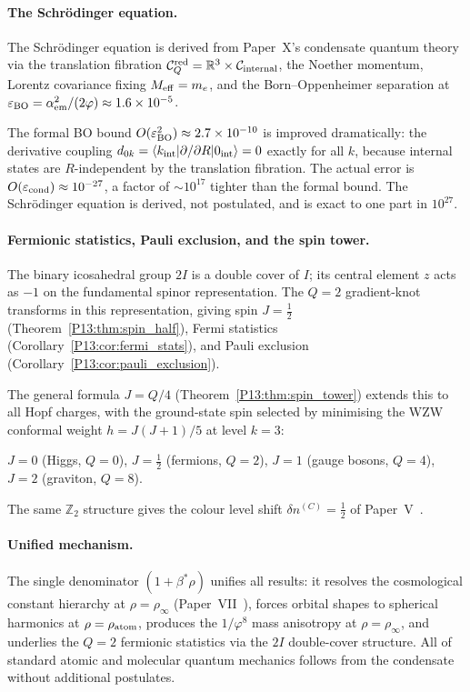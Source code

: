 \documentclass[11pt,a4paper]{article}
\theoremstyle{definition}
\theoremstyle{remark}
\newcommand{\vp}{\varphi}
\newcommand{\bst}{\beta^{*}}
\newcommand{\aem}{\alpha_{\mathrm{em}}}
\newcommand{\eps}{\varepsilon}
\newcommand{\rhoinf}{\rho_{\infty}}
\begin{document}
\paragraph{The Schr\"odinger equation.}
The Schr\"odinger equation is derived from Paper~X's condensate quantum
theory via the translation fibration $\mathcal{C}_Q^{\rm red}=\mathbb{R}^3\times\mathcal{C}_{\rm internal}$,
the Noether momentum, Lorentz covariance fixing $M_{\rm eff}=m_e$,
and the Born--Oppenheimer separation at $\eps_{\rm BO}=\aem^2/(2\vp)\approx1.6\times10^{-5}$.

The formal BO bound $O(\eps_{\rm BO}^2)\approx2.7\times10^{-10}$
is improved dramatically: the derivative coupling $d_{0k}=\langle k_{\rm int}|\partial/\partial R|0_{\rm int}\rangle=0$
exactly for all $k$, because internal states are $R$-independent by
the translation fibration.
The actual error is $O(\eps_{\rm cond})\approx10^{-27}$,
a factor of $\sim10^{17}$ tighter than the formal bound.
The Schr\"odinger equation is derived, not postulated, and is exact to
one part in $10^{27}$.

\paragraph{Fermionic statistics, Pauli exclusion, and the spin tower.}
The binary icosahedral group $2I$ is a double cover of $I$;
its central element $z$ acts as $-1$ on the fundamental spinor representation.
The $Q=2$ gradient-knot transforms in this representation, giving
spin $J=\tfrac{1}{2}$ (Theorem~\ref{P13:thm:spin_half}), Fermi statistics
(Corollary~\ref{P13:cor:fermi_stats}), and Pauli exclusion
(Corollary~\ref{P13:cor:pauli_exclusion}).

The general formula $J=Q/4$ (Theorem~\ref{P13:thm:spin_tower}) extends
this to all Hopf charges, with the ground-state spin selected by
minimising the WZW conformal weight $h=J(J+1)/5$ at level $k=3$:
\begin{center}
$J=0$ (Higgs, $Q=0$),\quad
$J=\tfrac{1}{2}$ (fermions, $Q=2$),\quad
$J=1$ (gauge bosons, $Q=4$),\quad
$J=2$ (graviton, $Q=8$).
\end{center}
The same $\mathbb{Z}_2$ structure gives the colour level shift
$\delta n^{(C)}=\tfrac{1}{2}$ of Paper~V~\cite{Paper5}.

\paragraph{Unified mechanism.}
The single denominator $(1+\bst\rho)$ unifies all results:
it resolves the cosmological constant hierarchy at $\rho=\rhoinf$
(Paper~VII~\cite{Paper7}), forces orbital shapes to spherical harmonics
at $\rho=\rho_{\rm atom}$, produces the $1/\vp^8$ mass anisotropy at
$\rho=\rhoinf$, and underlies the $Q=2$ fermionic statistics via the
$2I$ double-cover structure.
All of standard atomic and molecular quantum mechanics follows from
the condensate without additional postulates.
\end{document}
